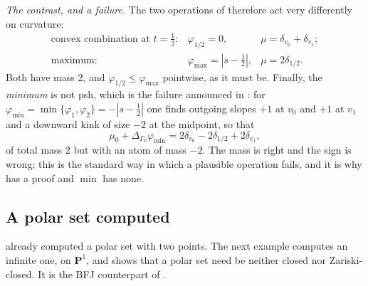 \begin{example}
\emph{The contrast, and a failure.}  The two operations of
 therefore act very differently on curvature:
\[
 \begin{array}{lll}
  \text{convex combination at }t=\tfrac12:
   &\varphi_{1/2}=0,
   &\mu=\delta_{v_0}+\delta_{v_1};\\[2pt]
  \text{maximum:}
   &\varphi_{\max}=|s-\tfrac12|,
   &\mu=2\delta_{1/2}.
 \end{array}
\]
Both have mass \(2\), and \(\varphi_{1/2}\leq\varphi_{\max}\) pointwise, as
it must be.  Finally, the \emph{minimum} is not psh, which is the failure
announced in : for
\(\varphi_{\min}=\min\{\varphi_1,\varphi_2\}=-|s-\tfrac12|\) one finds
outgoing slopes \(+1\) at \(v_0\) and \(+1\) at \(v_1\) and a downward
kink of size \(-2\) at the midpoint, so that
\[
 \mu_0+\Delta_{\Gamma_0}\varphi_{\min}
 =2\delta_{v_0}-2\delta_{1/2}+2\delta_{v_1},
\]
of total mass \(2\) but with an atom of mass \(-2\).  The mass is right and
the sign is wrong; this is the standard way in which a plausible operation
fails, and it is why  has a proof and
\(\min\) has none.
\end{example}

\subsection{A polar set computed}
\label{sec:ch21-worked-polar}

 already computed a polar set with two
points.  The next example computes an infinite one, on
\(\mathbf P^1\), and shows that a polar set need be neither closed nor
Zariski-closed.  It is the BFJ counterpart of
.

